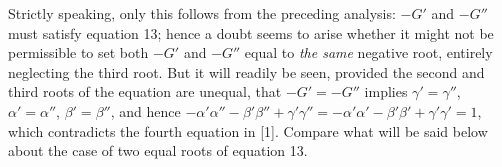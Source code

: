 \expandafter\def\csname HistoricalNoteText26\endcsname{Strictly speaking, only this follows from the preceding analysis: $-G'$ and $-G''$ must satisfy equation 13; hence a doubt seems to arise whether it might not be permissible to set both $-G'$ and $-G''$ equal to \textit{the same} negative root, entirely neglecting the third root. But it will readily be seen, provided the second and third roots of the equation are unequal, that $-G'=\allowbreak -G''$ implies $\gamma'=\gamma''$, $\alpha'=\alpha''$, $\beta'=\beta''$, and hence
$-\alpha'\alpha''-\beta'\beta''+\allowbreak \gamma'\gamma''=\allowbreak -\alpha'\alpha'-\beta'\beta'+\allowbreak \gamma'\gamma'=1$, which contradicts the fourth equation in [1]. Compare what will be said below about the case of two equal roots of equation 13.}
